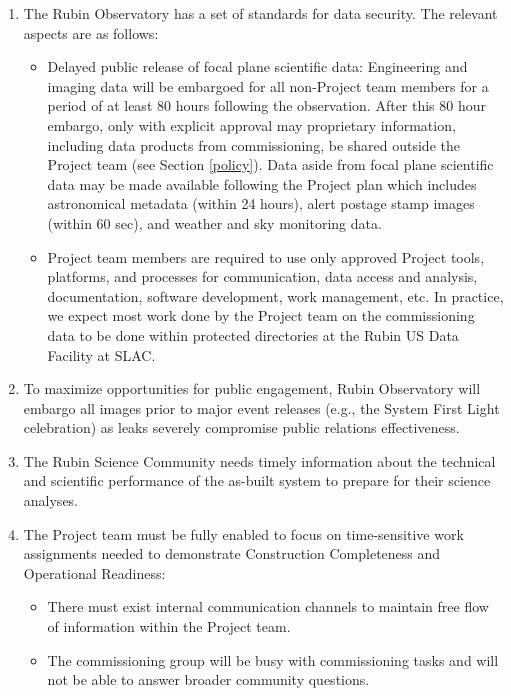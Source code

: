 \documentclass[SE,authoryear,toc]{lsstdoc}
\begin{document}
\begin{enumerate}

  \item The Rubin Observatory has a set of standards for data security.
  The relevant aspects are as follows:

  \begin{itemize}

    \item Delayed public release of focal plane scientific data:
    Engineering and imaging data will be embargoed for all non-Project team members for a period of at least 80 hours following the observation.
    After this 80 hour embargo, only with explicit approval may proprietary information, including data products from commissioning, be shared outside the Project team (see Section \ref{policy}).
    Data aside from focal plane scientific data may be made available following the Project plan which includes astronomical metadata (within 24 hours), alert postage stamp images (within 60 sec), and weather and sky monitoring data.

    \item Project team members are required to use only approved Project tools, platforms, and processes for communication, data access and analysis, documentation, software development, work management, etc.
    In practice, we expect most work done by the Project team on the commissioning data to be done within protected directories at the Rubin US Data Facility at SLAC.

  \end{itemize}

  \item To maximize opportunities for public engagement, Rubin Observatory will embargo all images prior to major event releases (e.g., the System First Light celebration) as leaks severely compromise public relations effectiveness.

  \item The Rubin Science Community needs timely information about the technical and scientific performance of the as-built system to prepare for their science analyses.

  \item The Project team must be fully enabled to focus on time-sensitive work assignments needed to demonstrate Construction Completeness and Operational Readiness:

  \begin{itemize}

    \item There must exist internal communication channels to maintain free flow of information within the Project team.

    \item The commissioning group will be busy with commissioning tasks and will not be able to answer broader community questions.

  \end{itemize}

\end{enumerate}
\end{document}

